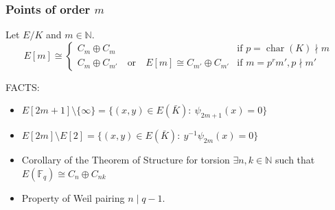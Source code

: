 \documentclass[10pt,handout]{beamer} %
\newcommand{\N}{\mathbb N}
\newcommand{\F}{\mathbb F}
\theoremstyle{definition}
\begin{document}
\begin{frame}\frametitle{Points of order $m$}
\pause

\begin{theorem}
Let $E/K$  and $m\in\N$. 
$$E[m]\cong \begin{cases}
             C_m\oplus C_m & \text{if }p=\operatorname{char}(K)\nmid m\\
             C_m\oplus C_{m'}\quad\text{or}\quad E[m] \cong C_{m'}\oplus C_{m'} &\text{if }m=p^rm', p\nmid m'
            \end{cases}
$$\end{theorem}\pause


\begin{beamerboxesrounded}[upper=block title example,lower=block body alerted,shadow=true]{FACTS:}
\begin{itemize}[<+-| alert@+>]
\item $E[2m+1]\setminus \{\infty\}= \{(x,y)\in E(\bar{K}):\  \psi_{2m+1}(x)=0\}$
\item $E[2m]\setminus E[2]= \{(x,y)\in E(\bar{K}):\  y^{-1}\psi_{2m}(x)=0\}$
\item \alert{Corollary of the Theorem of Structure for torsion} $\exists n,k\in\mathbb N$ such that
$E(\F_q)\cong C_n\oplus C_{nk}$
\item \alert{Property of Weil pairing} $n\mid q-1$.
\end{itemize}
\end{beamerboxesrounded}




\end{frame}
\end{document}
